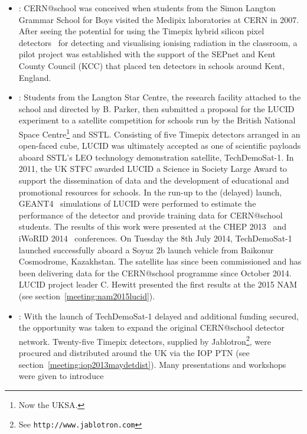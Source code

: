 \begin{itemize}
\item {}:
CERN@school was conceived when students from the
Simon Langton Grammar School for Boys
visited the Medipix laboratories at \acs{CERN} in 2007.
%
After seeing the potential for using the
Timepix hybrid silicon pixel detectors~\cite{Timepix2007,TimepixErratum2008}
for detecting and visualising ionising radiation in the
classroom,
a pilot project was established with the support of
the \acf{SEPnet}
and
Kent County Council (KCC)
that placed ten detectors in schools around Kent, England.
%
\item {}: 
Students from the Langton Star Centre,
the research facility attached to the school and
directed by B. Parker,
then submitted a proposal for the
\acf{LUCID}
experiment to a satellite competition for schools
run by the British National Space Centre\footnote{
  Now the \acf{UKSA}.
} and
\acf{SSTL}.
%
Consisting of five Timepix detectors arranged in an
open-faced cube, \ac{LUCID} was ultimately accepted as one of
scientific payloads aboard SSTL's \ac{LEO} technology demonstration
satellite, TechDemoSat-1.
%
In 2011, the UK \acf{STFC}
awarded \ac{LUCID} a Science in Society Large Award to support the
dissemination of data and the development of educational and
promotional resources for schools.
%
In the run-up to the (delayed) launch,
GEANT4~\cite{GEANT42003,GEANT42006}
simulations of LUCID were performed to estimate the performance
of the detector and provide training data for CERN@school students.
The results of this work were presented at the
\acs{CHEP} 2013~\cite{Whyntie2014} and \acs{iWoRID} 2014~\cite{Whyntie2015a}
conferences.
%
On Tuesday the 8th July 2014,
TechDemoSat-1 launched successfully aboard a Soyuz 2b
launch vehicle from Baikonur Cosmodrome, Kazakhstan. The satellite has
since been commissioned and has been delivering data for the CERN@school
programme since October 2014. LUCID project leader
C. Hewitt presented the first results at the 2015 \acf{NAM}
(see section~\ref{meeting:nam2015lucid}).
%
\item {}:
With the launch of TechDemoSat-1 delayed
and additional funding secured,
the opportunity was taken 
to expand the original CERN@school detector network.
Twenty-five Timepix detectors,
supplied by Jablotron\footnote{%
  See \texttt{http://www.jablotron.com}},
were procured and distributed around the UK
via the \acf{IOP}
\acf{PTN} (see section~\ref{meeting:iop2013maydetdist}).
%
Many presentations and workshops were given to introduce

\end{itemize}
